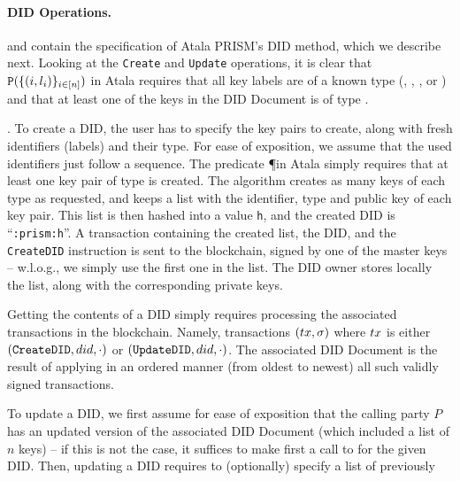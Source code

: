 \paragraph{DID Operations.} %
 and  contain the
specification of Atala PRISM's DID method,
which we describe next. Looking at the \texttt{Create} and \texttt{Update}
operations, it is clear that $\mathtt{P}(\lbrace (i, l_i) \rbrace_{i\in[n]})$ in
Atala requires that all key labels are of a known type (\MasterKey, \IssueKey,
\CommKey, or \AuthKey) and that at least one of the keys in the DID Document
is of type \MasterKey.

\begin{description}
\item{.} %
  To create a DID, the user has to specify the key pairs to create, along with
  fresh identifiers (labels) and their type. For ease of exposition, we assume
  that the used identifiers just follow a sequence. The predicate \P in Atala
  simply requires that at least one key pair of \MasterKey type is created. The
   algorithm creates as many keys of each type as requested,
  and keeps a list with the identifier, type and public key of each key pair.
  This list is then hashed into a value \texttt{h}, and the created DID is
  ``\texttt{\did:prism:h}''. A transaction containing the created list, the
  DID, and the \texttt{CreateDID} instruction is sent to the blockchain,
  signed by one of the master keys -- w.l.o.g., we simply use the first one
  in the list. The DID owner stores locally the list, along with the
  corresponding private keys.
\item[\uccmd{Read}.] %
  Getting the contents of a DID simply requires processing the associated
  transactions in the blockchain. Namely, transactions $(tx,\sigma)$ where $tx$
  is either $(\texttt{CreateDID},did,\cdot)$ or $(\texttt{UpdateDID},did,
  \cdot)$. The associated DID Document is the result of applying in an ordered
  manner (from oldest to newest) all such validly signed transactions.
\item[\uccmd{Update}.] %
  To update a DID, we first assume for ease of exposition that the calling party
  $P$ has an updated version of the associated DID Document (which included
  a list of $n$ keys) -- if this is not the case, it suffices to make first a
  call to  for the given DID. 
  Then, updating a DID requires to (optionally) specify a list of previously

\end{description}
